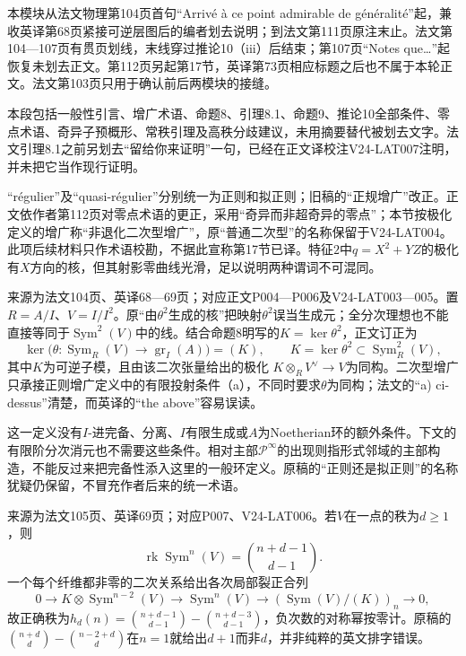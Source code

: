 \label{audit:V24-late}
\begingroup
\def\Sym{\operatorname{Sym}}
\def\gr{\operatorname{gr}}
\def\im{\operatorname{im}}
\def\Oa{\mathcal O}
\def\Pp{\mathcal P}

本模块从法文物理第104页首句“Arrivé à ce point admirable de généralité”起，兼收英译第68页紧接可逆层图后的编者划去说明；到法文第111页原注末止。法文第104—107页有贯页划线，末线穿过推论10（iii）后结束；第107页“Notes que…”起恢复未划去正文。第112页另起第17节，英译第73页相应标题之后也不属于本轮正文。法文第103页只用于确认前后两模块的接缝。

本段包括一般性引言、增广术语、命题8、引理8.1、命题9、推论10全部条件、零点术语、奇异子预概形、常秩引理及高秩分歧建议，未用摘要替代被划去文字。法文引理8.1之前另划去“留给你来证明”一句，已经在正文译校注V24-LAT007注明，并未把它当作现行证明。

“régulier”及“quasi-régulier”分别统一为正则和拟正则；旧稿的“正规增广”改正。正文依作者第112页对零点术语的更正，采用“奇异而非超奇异的零点”；本节按极化定义的增广称“非退化二次型增广”，原“普通二次型”的名称保留于V24-LAT004。此项后续材料只作术语校勘，不据此宣称第17节已译。特征$2$中$q=X^2+YZ$的极化有$X$方向的核，但其射影零曲线光滑，足以说明两种谓词不可混同。

来源为法文104页、英译68—69页；对应正文P004—P006及V24-LAT003—005。置$R=A/I$、$V=I/I^2$。原“由$\theta^2$生成的核”把映射$\theta^2$误当生成元；全分次理想也不能直接等同于$\Sym^2(V)$中的线。结合命题8明写的$K=\ker\theta^2$，正文订正为
\[
\ker\bigl(\theta:\Sym_R(V)\to\gr_I(A)\bigr)=(K),
\qquad K=\ker\theta^2\subset\Sym_R^2(V),
\]
其中$K$为可逆子模，且由该二次张量给出的极化
$K\otimes_RV^\vee\to V$为同构。二次型增广只承接正则增广定义中的有限投射条件（a），不同时要求$\theta$为同构；法文的“a) ci-dessus”清楚，而英译的“the above”容易误读。

这一定义没有$I$-进完备、分离、$I$有限生成或$A$为Noetherian环的额外条件。下文的有限阶分次消元也不需要这些条件。相对主部$\Pp^\infty$的出现则指形式邻域的主部构造，不能反过来把完备性添入这里的一般环定义。原稿的“正则还是拟正则”的名称犹疑仍保留，不冒充作者后来的统一术语。

来源为法文105页、英译69页；对应P007、V24-LAT006。若$V$在一点的秩为$d\ge1$，则
\[
\operatorname{rk}\Sym^n(V)=\binom{n+d-1}{d-1}.
\]
一个每个纤维都非零的二次关系给出各次局部裂正合列
\[
0\longrightarrow K\otimes\Sym^{n-2}(V)
\longrightarrow\Sym^n(V)
\longrightarrow(\Sym(V)/(K))_n\longrightarrow0,
\]
故正确秩为$h_d(n)=\binom{n+d-1}{d-1}-\binom{n+d-3}{d-1}$，负次数的对称幂按零计。原稿的$\binom{n+d}{d}-\binom{n-2+d}{d}$在$n=1$就给出$d+1$而非$d$，并非纯粹的英文排字错误。

